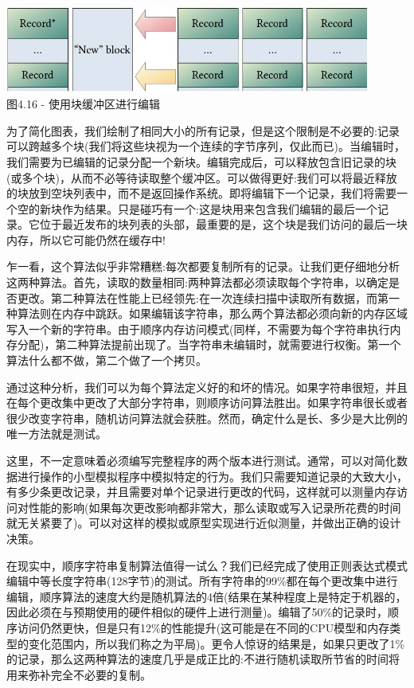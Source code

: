 \begin{center}
\includegraphics[width=0.9\textwidth]{content/1/chapter4/images/16.jpg}\\
图4.16 - 使用块缓冲区进行编辑
\end{center}

为了简化图表，我们绘制了相同大小的所有记录，但是这个限制是不必要的:记录可以跨越多个块(我们将这些块视为一个连续的字节序列，仅此而已)。当编辑时，我们需要为已编辑的记录分配一个新块。编辑完成后，可以释放包含旧记录的块(或多个块)，从而不必等待读取整个缓冲区。可以做得更好:我们可以将最近释放的块放到空块列表中，而不是返回操作系统。即将编辑下一个记录，我们将需要一个空的新块作为结果。只是碰巧有一个:这是块用来包含我们编辑的最后一个记录。它位于最近发布的块列表的头部，最重要的是，这个块是我们访问的最后一块内存，所以它可能仍然在缓存中!

乍一看，这个算法似乎非常糟糕:每次都要复制所有的记录。让我们更仔细地分析这两种算法。首先，读取的数量相同:两种算法都必须读取每个字符串，以确定是否更改。第二种算法在性能上已经领先:在一次连续扫描中读取所有数据，而第一种算法则在内存中跳跃。如果编辑该字符串，那么两个算法都必须向新的内存区域写入一个新的字符串。由于顺序内存访问模式(同样，不需要为每个字符串执行内存分配)，第二种算法提前出现了。当字符串未编辑时，就需要进行权衡。第一个算法什么都不做，第二个做了一个拷贝。

通过这种分析，我们可以为每个算法定义好的和坏的情况。如果字符串很短，并且在每个更改集中更改了大部分字符串，则顺序访问算法胜出。如果字符串很长或者很少改变字符串，随机访问算法就会获胜。然而，确定什么是长、多少是大比例的唯一方法就是测试。

这里，不一定意味着必须编写完整程序的两个版本进行测试。通常，可以对简化数据进行操作的小型模拟程序中模拟特定的行为。我们只需要知道记录的大致大小，有多少条更改记录，并且需要对单个记录进行更改的代码，这样就可以测量内存访问对性能的影响(如果每次更改影响都非常大，那么读取或写入记录所花费的时间就无关紧要了)。可以对这样的模拟或原型实现进行近似测量，并做出正确的设计决策。

在现实中，顺序字符串复制算法值得一试么？我们已经完成了使用正则表达式模式编辑中等长度字符串(128字节)的测试。所有字符串的99\%都在每个更改集中进行编辑，顺序算法的速度大约是随机算法的4倍(结果在某种程度上是特定于机器的，因此必须在与预期使用的硬件相似的硬件上进行测量)。编辑了50\%的记录时，顺序访问仍然更快，但是只有12\%的性能提升(这可能是在不同的CPU模型和内存类型的变化范围内，所以我们称之为平局)。更令人惊讶的结果是，如果只更改了1\%的记录，那么这两种算法的速度几乎是成正比的:不进行随机读取所节省的时间将用来弥补完全不必要的复制。

